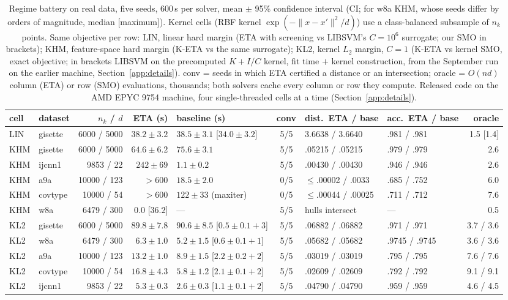 \documentclass[pdflatex,sn-apa]{sn-jnl}%
\theoremstyle{thmstyleone}
\theoremstyle{thmstyletwo}
\newcommand{\norm}[1]{\lVert #1 \rVert}
\begin{document}
\begin{table}\centering\scriptsize\setlength{\tabcolsep}{3.5pt}
\caption{Regime battery on real data, five seeds, 600\,s per solver,
mean $\pm$ 95\% confidence interval (CI; for w8a KHM, whose seeds differ by orders of
magnitude, median [maximum]). Kernel cells (RBF kernel
$\exp(-\norm{x-x'}^2/d)$) use a class-balanced subsample of $n_k$ points. Same objective per row: LIN,
linear hard margin (ETA with screening vs LIBSVM's $C{=}10^6$
surrogate; our SMO in brackets); KHM, feature-space hard margin (K-ETA
vs the same surrogate); KL2, kernel $L_2$ margin, $C{=}1$ (K-ETA vs
kernel SMO, exact objective; in brackets LIBSVM on the precomputed
$K+I/C$ kernel, fit time $+$ kernel construction, from the September
run on the earlier machine, Section~\ref{app:details}).
conv = seeds in which ETA certified a distance or an intersection; oracle = $O(nd)$ column (ETA) or
row (SMO) evaluations, thousands; both solvers cache every column or
row they compute. Released code on the AMD EPYC 9754 machine, four
single-threaded cells at a time (Section~\ref{app:details}).}\label{tab:regime}
\begin{tabular}{llrrlcllr}
\toprule
cell & dataset & $n_k$ / $d$ & ETA (s) & baseline (s) & conv & dist.\ ETA / base & acc.\ ETA / base & oracle \\
\midrule
LIN & gisette & 6000 / 5000 & $38.2\pm3.2$ & $38.5\pm3.1$ [$34.0\pm3.2$] & 5/5 & 3.6638 / 3.6640 & .981 / .981 & 1.5 [1.4] \\
\midrule
KHM & gisette & 6000 / 5000 & $64.6\pm6.2$ & $75.6\pm3.1$ & 5/5 & .05215 / .05215 & .979 / .979 & 2.6 \\
KHM & ijcnn1 & 9853 / 22 & $242\pm69$ & $1.1\pm0.2$ & 5/5 & .00430 / .00430 & .946 / .946 & 2.6 \\
KHM & a9a & 10000 / 123 & $>600$ & $18.5\pm2.0$ & 0/5 & $\le$.00002 / .0033 & .685 / .752 & 6.0 \\
KHM & covtype & 10000 / 54 & $>600$ & $122\pm33$ (maxiter) & 0/5 & $\le$.00044 / .00025 & .711 / .712 & 7.6 \\
KHM & w8a & 6479 / 300 & $0.0$ [$36.2$] & --- & 5/5 & hulls intersect & --- & 0.5 \\
\midrule
KL2 & gisette & 6000 / 5000 & $89.8\pm7.8$ & $90.6\pm8.5$ [$0.5\pm0.1+3$] & 5/5 & .06882 / .06882 & .971 / .971 & 3.7 / 3.6 \\
KL2 & w8a & 6479 / 300 & $6.3\pm1.0$ & $5.2\pm1.5$ [$0.6\pm0.1+1$] & 5/5 & .05682 / .05682 & .9745 / .9745 & 3.6 / 3.6 \\
KL2 & a9a & 10000 / 123 & $13.2\pm1.0$ & $8.9\pm1.5$ [$2.2\pm0.2+2$] & 5/5 & .03019 / .03019 & .795 / .795 & 7.6 / 7.6 \\
KL2 & covtype & 10000 / 54 & $16.8\pm4.3$ & $5.8\pm1.2$ [$2.1\pm0.1+2$] & 5/5 & .02609 / .02609 & .792 / .792 & 9.1 / 9.1 \\
KL2 & ijcnn1 & 9853 / 22 & $5.3\pm0.3$ & $2.6\pm0.3$ [$1.1\pm0.1+2$] & 5/5 & .04790 / .04790 & .959 / .959 & 4.6 / 4.5 \\
\bottomrule
\end{tabular}
\end{table}
\end{document}
